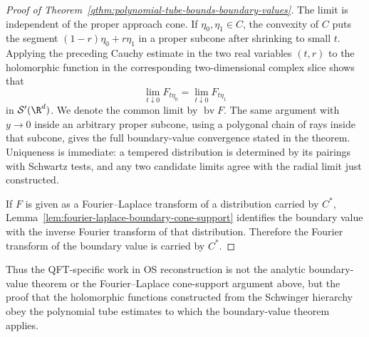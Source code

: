 \begin{proof}[Proof of Theorem~\ref{qthm:polynomial-tube-bounds-boundary-values}]
The limit is independent of the proper approach cone.  If \(\eta_0,\eta_1\in
C\), the convexity of \(C\) puts the segment
\((1-r)\eta_0+r\eta_1\) in a proper subcone after shrinking to small \(t\).
Applying the preceding Cauchy estimate in the two real variables \((t,r)\)
to the holomorphic function in the corresponding two-dimensional complex
slice shows that
\[
  \lim_{t\downarrow0}F_{t\eta_0}
  =
  \lim_{t\downarrow0}F_{t\eta_1}
\]
in \(\mathcal S'(\R^d)\).  We denote the common limit by
\(\operatorname{bv}F\).  The same argument with \(y\to0\) inside an arbitrary
proper subcone, using a polygonal chain of rays inside that subcone, gives
the full boundary-value convergence stated in the theorem.  Uniqueness is
immediate: a tempered distribution is determined by its pairings with
Schwartz tests, and any two candidate limits agree with the radial limit just
constructed.

If \(F\) is given as a Fourier--Laplace transform of a distribution carried
by \(C^*\), Lemma~\ref{lem:fourier-laplace-boundary-cone-support} identifies
the boundary value with the inverse Fourier transform of that distribution.
Therefore the Fourier transform of the boundary value is carried by \(C^*\).
\end{proof}

Thus the QFT-specific work in OS reconstruction is not the
analytic boundary-value theorem or the Fourier--Laplace cone-support argument
above, but the proof that the
holomorphic functions constructed from the Schwinger hierarchy obey the
polynomial tube estimates to which the boundary-value theorem applies.

